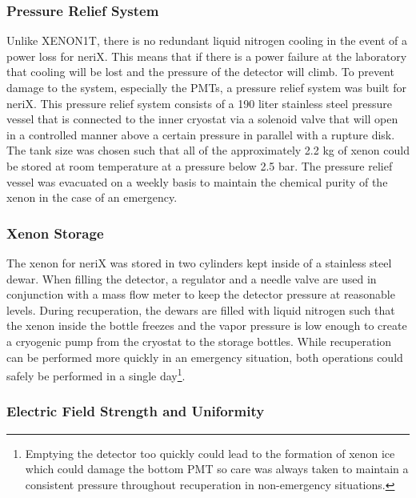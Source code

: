 \subsubsection{Pressure Relief System}
\label{sec:nerix_pressure_relief}

Unlike XENON1T, there is no redundant liquid nitrogen cooling in the event of a power loss for neriX.  This means that if there is a power failure at the laboratory that cooling will be lost and the pressure of the detector will climb.  To prevent damage to the system, especially the PMTs, a pressure relief system was built for neriX.  This pressure relief system consists of a 190 liter stainless steel pressure vessel that is connected to the inner cryostat via a solenoid valve that will open in a controlled manner above a certain pressure in parallel with a rupture disk.  The tank size was chosen such that all of the approximately 2.2 kg of xenon could be stored at room temperature at a pressure below 2.5 bar.  The pressure relief vessel was evacuated on a weekly basis to maintain the chemical purity of the xenon in the case of an emergency.


\subsubsection{Xenon Storage}

The xenon for neriX was stored in two cylinders kept inside of a stainless steel dewar.  When filling the detector, a regulator and a needle valve are used in conjunction with a mass flow meter to keep the detector pressure at reasonable levels.  During recuperation, the dewars are filled with liquid nitrogen such that the xenon inside the bottle freezes and the vapor pressure is low enough to create a cryogenic pump from the cryostat to the storage bottles.  While recuperation can be performed more quickly in an emergency situation, both operations could safely be performed in a single day\footnote{Emptying the detector too quickly could lead to the formation of xenon ice which could damage the bottom PMT so care was always taken to maintain a consistent pressure throughout recuperation in non-emergency situations.}.


\subsubsection{Electric Field Strength and Uniformity}


